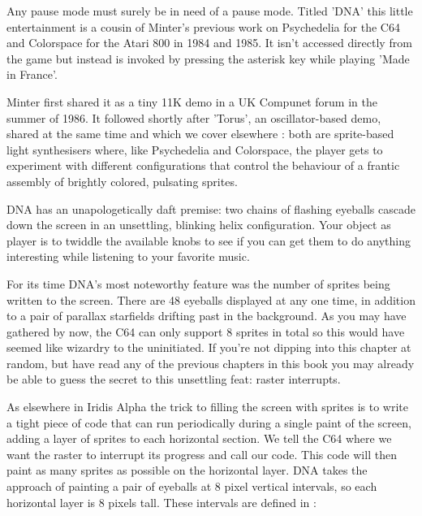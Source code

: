 Any pause mode must surely be in need of a pause mode. Titled 'DNA' this little entertainment is
a cousin of Minter's previous work on Psychedelia for the C64 and Colorspace for the Atari 800
in 1984 and 1985. It isn't accessed directly from the game but instead is invoked by pressing the
asterisk key while playing 'Made in France'.

Minter first shared it as a tiny 11K demo in a UK Compunet forum in the summer of 
1986. It followed shortly after 'Torus', an oscillator-based demo, shared at the same time and which we
cover elsewhere : both are sprite-based
light synthesisers where, like Psychedelia and Colorspace, the player gets to experiment with different
configurations that control the behaviour of a frantic assembly of brightly colored, pulsating sprites.

DNA has an unapologetically daft premise: two chains of flashing eyeballs cascade down the
screen in an unsettling, blinking helix configuration. Your object as player is to twiddle the available
knobs to see if you can get them to do anything interesting while listening to your favorite music.

For its time DNA's most noteworthy feature was the number of sprites being written to the screen. There are
48 eyeballs displayed at any one time, in addition to a pair of parallax starfields drifting past in the
background. As you may have gathered by now, the C64 can only support 8 sprites in total so this would
have seemed like wizardry to the uninitiated. If you're not dipping into this chapter at random, but have
read any of the previous chapters in this book you may already be able to guess the secret to this 
unsettling feat: raster interrupts.

As elsewhere in Iridis Alpha the trick to filling the screen with sprites is to write a tight piece of code
that can run periodically during a single paint of the screen, adding a layer of sprites to each horizontal
section. We tell the C64 where we want the raster to interrupt its progress and call our code. This code
will then paint as many sprites as possible on the horizontal layer. DNA takes the approach of painting a
pair of eyeballs at 8 pixel vertical intervals, so each horizontal layer is 8 pixels tall. 
These intervals are defined in :

